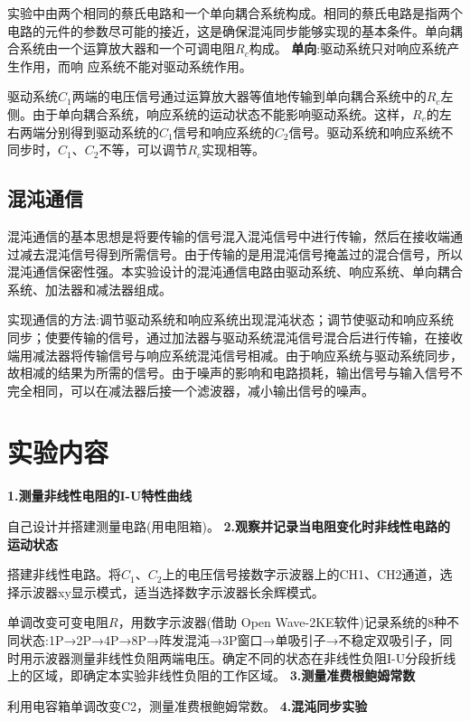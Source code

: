 \documentclass[UTF8]{ctexart}
\begin{document}
\begin{multicols}{2}
实验中由两个相同的蔡氏电路和一个单向耦合系统构成。相同的蔡氏电路是指两个电路的元件的参数尽可能的接近，这是确保混沌同步能够实现的基本条件。单向耦合系统由一个运算放大器和一个可调电阻$R_c$构成。
\newline\textbf{单向}:驱动系统只对响应系统产生作用，而响
应系统不能对驱动系统作用。

驱动系统$C_1$两端的电压信号通过运算放大器等值地传输到单向耦合系统中的$R_c$左侧。由于单向耦合系统，响应系统的运动状态不能影响驱动系统。这样，$R_c$的左右两端分别得到驱动系统的$C_1$信号和响应系统的$C_2$信号。驱动系统和响应系统不同步时，$C_1$、$C_2$不等，可以调节$R_c$实现相等。

\subsection{混沌通信}
混沌通信的基本思想是将要传输的信号混入混沌信号中进行传输，然后在接收端通过减去混沌信号得到所需信号。由于传输的是用混沌信号掩盖过的混合信号，所以混沌通信保密性强。本实验设计的混沌通信电路由驱动系统、响应系统、单向耦合系统、加法器和减法器组成。

实现通信的方法:调节驱动系统和响应系统出现混沌状态；调节使驱动和响应系统同步；使要传输的信号，通过加法器与驱动系统混沌信号混合后进行传输，在接收端用减法器将传输信号与响应系统混沌信号相减。由于响应系统与驱动系统同步，故相减的结果为所需的信号。由于噪声的影响和电路损耗，输出信号与输入信号不完全相同，可以在减法器后接一个滤波器，减小输出信号的噪声。

\section{实验内容}
\noindent\textbf{1.测量非线性电阻的I-U特性曲线}

自己设计并搭建测量电路(用电阻箱)。
\newline\textbf{2.观察并记录当电阻变化时非线性电路的运动状态}

搭建非线性电路。将$C_1$、$C_2$上的电压信号接数字示波器上的CH1、CH2通道，选择示波器xy显示模式，适当选择数字示波器长余辉模式。

单调改变可变电阻$R$，用数字示波器(借助 Open Wave-2KE软件)记录系统的8种不同状态:1P→2P→4P→8P→阵发混沌→3P窗口→单吸引子→不稳定双吸引子，同时用示波器测量非线性负阻两端电压。确定不同的状态在非线性负阻I-U分段折线上的区域，即确定本实验非线性负阻的工作区域。
\newline\textbf{3.测量准费根鲍姆常数}

利用电容箱单调改变C2，测量准费根鲍姆常数。
\newline\textbf{4.混沌同步实验}


\end{multicols}
\end{document}
